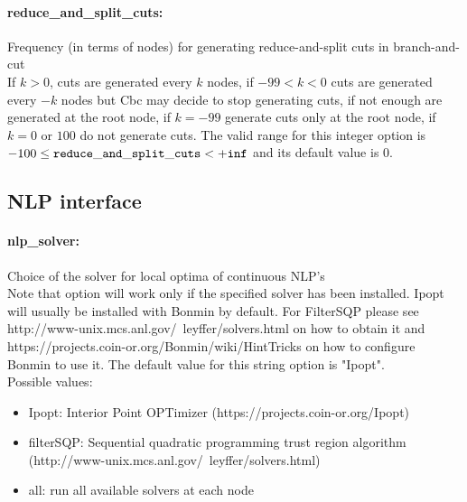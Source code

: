 \paragraph{reduce\_and\_split\_cuts:}\label{opt:reduce_and_split_cuts} Frequency (in terms of nodes) for generating reduce-and-split cuts in branch-and-cut \\
 If $k > 0$, cuts are generated every $k$ nodes, if $-99 < k < 0$ cuts are generated every $-k$ nodes but Cbc may decide to stop generating cuts, if not enough are generated at the root node, if $k=-99$ generate cuts only at the root node, if $k=0$ or $100$ do not generate cuts. The valid range for this integer option is
$-100 \le {\tt reduce\_and\_split\_cuts } <  {\tt +inf}$
and its default value is $0$.


\subsection{NLP interface}
\label{sec:NLPinterface}
\paragraph{nlp\_solver:}\label{opt:nlp_solver} Choice of the solver for local optima of continuous NLP's \\
 Note that option will work only if the specified solver has been installed. Ipopt will usually be installed with Bonmin by default. For FilterSQP please see http://www-unix.mcs.anl.gov/~leyffer/solvers.html on how to obtain it and https://projects.coin-or.org/Bonmin/wiki/HintTricks on how to configure Bonmin to use it. The default value for this string option is "Ipopt".
\\ 
Possible values:
\begin{itemize}
   \item Ipopt: Interior Point OPTimizer (https://projects.coin-or.org/Ipopt)
   \item filterSQP: Sequential quadratic programming trust region algorithm (http://www-unix.mcs.anl.gov/~leyffer/solvers.html)
   \item all: run all available solvers at each node
\end{itemize}

